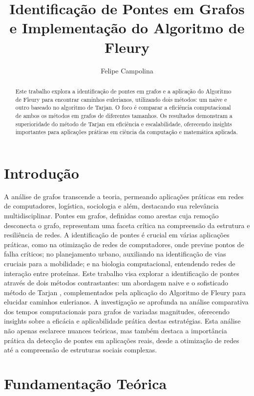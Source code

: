 \documentclass[12pt]{article}
\title{Identificação de Pontes em Grafos e Implementação do Algoritmo de Fleury}
\author{Felipe Campolina\inst{1}}
\begin{document}
 

\maketitle
\begin{abstract}
Este trabalho explora a identificação de pontes em grafos e a aplicação do Algoritmo de Fleury para encontrar caminhos eulerianos, utilizando dois métodos: um naive e outro baseado no algoritmo de Tarjan. O foco é comparar a eficiência computacional de ambos os métodos em grafos de diferentes tamanhos. Os resultados demonstram a superioridade do método de Tarjan em eficiência e escalabilidade, oferecendo insights importantes para aplicações práticas em ciência da computação e matemática aplicada.
\end{abstract}


\section{Introdução}
A análise de grafos transcende a teoria, permeando aplicações práticas em redes de computadores, logística, sociologia e além, destacando sua relevância multidisciplinar. Pontes em grafos, definidas como arestas cuja remoção desconecta o grafo, representam uma faceta crítica na compreensão da estrutura e resiliência de redes. A identificação de pontes é crucial em várias aplicações práticas, como na otimização de redes de computadores, onde previne pontos de falha críticos; no planejamento urbano, auxiliando na identificação de vias cruciais para a mobilidade; e na biologia computacional, entendendo redes de interação entre proteínas. Este trabalho visa explorar a identificação de pontes através de dois métodos contrastantes: um abordagem naive e o sofisticado método de Tarjan \cite{tarjan1972depth}, complementados pela aplicação do Algoritmo de Fleury \cite{fleury1883deux} para elucidar caminhos eulerianos. A investigação se aprofunda na análise comparativa dos tempos computacionais para grafos de variadas magnitudes, oferecendo insights sobre a eficácia e aplicabilidade prática destas estratégias. Esta análise não apenas esclarece nuances teóricas, mas também destaca a importância prática da detecção de pontes em aplicações reais, desde a otimização de redes até a compreensão de estruturas sociais complexas.

\section{Fundamentação Teórica}
\end{document}

